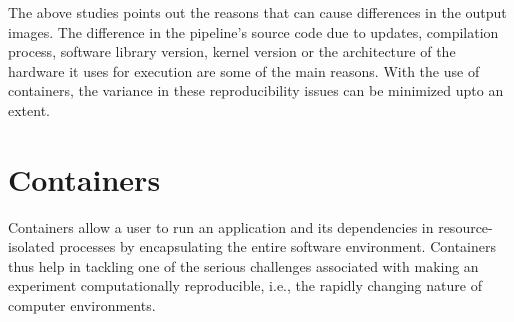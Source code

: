 The above studies points out the reasons that can cause differences in the output images. The difference in the pipeline's source code due to updates, compilation process, software library version, kernel version or the architecture of the hardware it uses for execution are some of the main reasons. With the use of containers, the variance in these reproducibility issues can be minimized upto an extent.

\section{Containers}
Containers allow a user to run an application and its dependencies in resource-isolated processes by encapsulating the entire software environment. Containers thus help in tackling one of the serious challenges associated with making an experiment computationally reproducible, i.e., the rapidly changing nature of computer environments.


